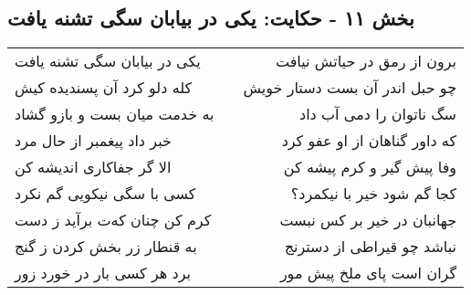 \begin{center}
\section*{بخش ۱۱ - حکایت: یکی در بیابان سگی تشنه یافت}
\label{sec:011}
\begin{longtable}{l p{0.5cm} r}
یکی در بیابان سگی تشنه یافت
&&
برون از رمق در حیاتش نیافت
\\
کله دلو کرد آن پسندیده کیش
&&
چو حبل اندر آن بست دستار خویش
\\
به خدمت میان بست و بازو گشاد
&&
سگ ناتوان را دمی آب داد
\\
خبر داد پیغمبر از حال مرد
&&
که داور گناهان از او عفو کرد
\\
الا گر جفاکاری اندیشه کن
&&
وفا پیش گیر و کرم پیشه کن
\\
کسی با سگی نیکویی گم نکرد
&&
کجا گم شود خیر با نیکمرد؟
\\
کرم کن چنان که‌ت برآید ز دست
&&
جهانبان در خیر بر کس نبست
\\
به قنطار زر بخش کردن ز گنج
&&
نباشد چو قیراطی از دسترنج
\\
برد هر کسی بار در خورد زور
&&
گران است پای ملخ پیش مور
\\
\end{longtable}
\end{center}
